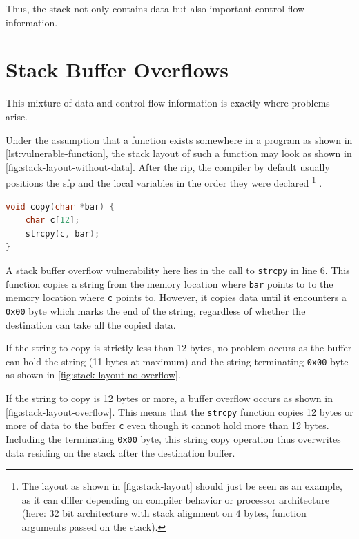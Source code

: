 Thus, the stack not only contains data but also important control flow information.

\section{Stack Buffer Overflows}
\label{sec:stack-buffer-overflows}

This mixture of data and control flow information is exactly where problems arise.

Under the assumption that a function exists somewhere in a program as shown in \cref{lst:vulnerable-function}, the stack layout of such a function may look as shown in \cref{fig:stack-layout-without-data}.
After the \gls{rip}, the compiler by default usually positions the \gls{sfp} and the local variables in the order they were declared%
	\footnote{
		The layout as shown in \cref{fig:stack-layout} should just be seen as an example, as it can differ depending on compiler behavior or processor architecture (here: 32 bit architecture with stack alignment on 4 bytes, function arguments passed on the stack).
	}%
.

\begin{lstlisting}[language=C,float=ht,caption={C function with buffer overflow vulnerability}, label={lst:vulnerable-function}]
void copy(char *bar) {
    char c[12];
    strcpy(c, bar);
}
\end{lstlisting}

A stack buffer overflow vulnerability here lies in the call to \texttt{strcpy} in line 6.
This function copies a string from the memory location where \texttt{bar} points to to the memory location where \texttt{c} points to.
However, it copies data until it encounters a \texttt{0x00} byte which marks the end of the string, regardless of whether the destination can take all the copied data.

If the string to copy is strictly less than 12 bytes, no problem occurs as the buffer can hold the string (11 bytes at maximum) and the string terminating \texttt{0x00} byte as shown in \cref{fig:stack-layout-no-overflow}.

If the string to copy is 12 bytes or more, a buffer overflow occurs as shown in \cref{fig:stack-layout-overflow}.
This means that the \texttt{strcpy} function copies 12 bytes or more of data to the buffer \texttt{c} even though it cannot hold more than 12 bytes.
Including the terminating \texttt{0x00} byte, this string copy operation thus overwrites data residing on the stack after the destination buffer.

